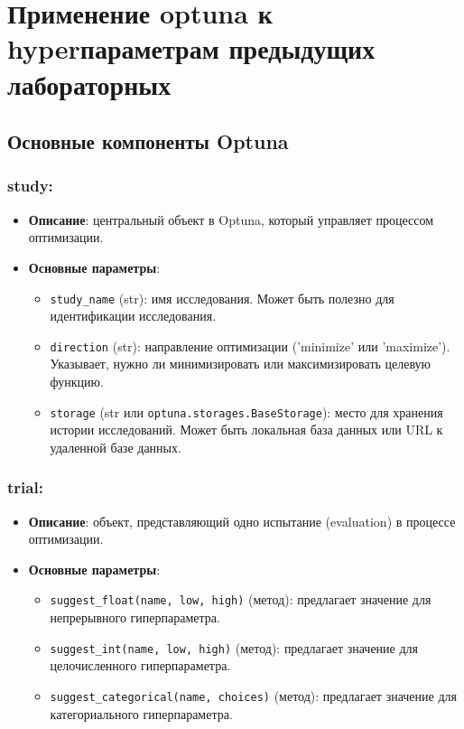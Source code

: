 \documentclass{article}
\begin{document}
\section*{Применение optuna к hyperпараметрам предыдущих лабораторных}
\subsection*{Основные компоненты Optuna}

\subsubsection*{study:}
\begin{itemize}
    \item \textbf{Описание}: центральный объект в Optuna, который управляет процессом оптимизации.
    \item \textbf{Основные параметры}:
    \begin{itemize}
        \item \texttt{study\_name} (str): имя исследования. Может быть полезно для идентификации исследования.
        \item \texttt{direction} (str): направление оптимизации ('minimize' или 'maximize'). Указывает, нужно ли минимизировать или максимизировать целевую функцию.
        \item \texttt{storage} (str или \texttt{optuna.storages.BaseStorage}): место для хранения истории исследований. Может быть локальная база данных или URL к удаленной базе данных.
    \end{itemize}
\end{itemize}

\subsubsection*{trial:}
\begin{itemize}
    \item \textbf{Описание}: объект, представляющий одно испытание (evaluation) в процессе оптимизации.
    \item \textbf{Основные параметры}:
    \begin{itemize}
        \item \texttt{suggest\_float(name, low, high)} (метод): предлагает значение для непрерывного гиперпараметра.
        \item \texttt{suggest\_int(name, low, high)} (метод): предлагает значение для целочисленного гиперпараметра.
        \item \texttt{suggest\_categorical(name, choices)} (метод): предлагает значение для категориального гиперпараметра.
    \end{itemize}
\end{itemize}
\end{document}
